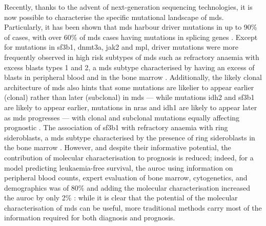 Recently, thanks to the advent of next-generation sequencing technologies, it is now possible to characterise the specific mutational landscape of \ac{mds}. Particularly, it has been shown that \ac{mds} harbour driver mutations in up to 90\% of cases, with over 60\% of \ac{mds} cases having mutations in splicing genes \cite{Papaemmanuil2013-yt,Haferlach2014-bh}. Except for mutations in \ac{sf3b1}, \ac{dnmt3a}, \ac{jak2} and \ac{mpl}, driver mutations were more frequently observed in high risk subtypes of \ac{mds} such as refractory anaemia with excess blasts types 1 and 2, a \ac{mds} subtype characterised by having an excess of blasts in peripheral blood and in the bone marrow \cite{Haferlach2014-bh}. Additionally, the likely clonal architecture of \ac{mds} also hints that some mutations are likelier to appear earlier (clonal) rather than later (subclonal) in \ac{mds} --- while mutations \ac{idh2} and \ac{sf3b1} are likely to appear earlier, mutations in \ac{nras} and \ac{idh1} are likely to appear later as \ac{mds} progresses --- with clonal and subclonal mutations equally affecting prognostic \cite{Papaemmanuil2013-yt}. The association of \ac{sf3b1} with refractory anaemia with ring sideroblasts, a \ac{mds} subtype characterised by the presence of ring sideroblasts in the bone marrow \cite{Papaemmanuil2011-nr, Papaemmanuil2013-yt, Haferlach2014-bh}. However, and despite their informative potential, the contribution of molecular characterisation to prognosis is reduced; indeed, for a model predicting leukaemia-free survival, the \ac{auroc} using information on peripheral blood counts, expert evaluation of bone marrow, cytogenetics, and demographics was of 80\% and adding the molecular characterisation increased the \ac{auroc} by only 2\% \cite{Papaemmanuil2013-yt}: while it is clear that the potential of the molecular characterisation of \ac{mds} can be useful, more traditional methods carry most of the information required for both diagnosis and prognosis.

